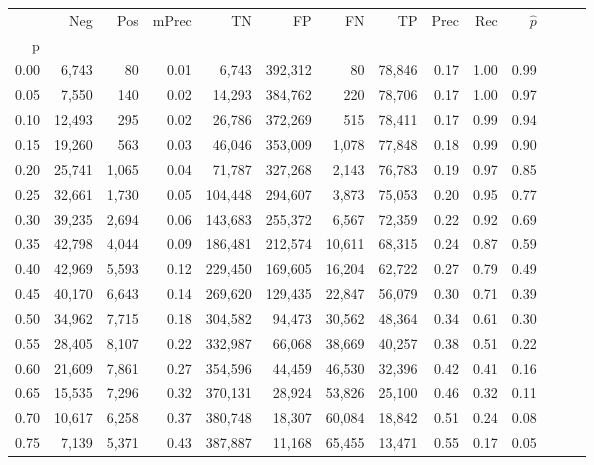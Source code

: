 \begin{tabular}{rrrrrrrrrrrrrr}
\toprule
{} &     Neg &    Pos & mPrec &       TN &       FP &      FN &      TP &  Prec &   Rec & $\hat{p}$ \\
p    &         &        &       &          &          &         &         &       &       &           \\
\midrule
0.00 &   6,743 &     80 &  0.01 &    6,743 &  392,312 &      80 &  78,846 &  0.17 &  1.00 &      0.99 \\
0.05 &   7,550 &    140 &  0.02 &   14,293 &  384,762 &     220 &  78,706 &  0.17 &  1.00 &      0.97 \\
0.10 &  12,493 &    295 &  0.02 &   26,786 &  372,269 &     515 &  78,411 &  0.17 &  0.99 &      0.94 \\
0.15 &  19,260 &    563 &  0.03 &   46,046 &  353,009 &   1,078 &  77,848 &  0.18 &  0.99 &      0.90 \\
0.20 &  25,741 &  1,065 &  0.04 &   71,787 &  327,268 &   2,143 &  76,783 &  0.19 &  0.97 &      0.85 \\
0.25 &  32,661 &  1,730 &  0.05 &  104,448 &  294,607 &   3,873 &  75,053 &  0.20 &  0.95 &      0.77 \\
0.30 &  39,235 &  2,694 &  0.06 &  143,683 &  255,372 &   6,567 &  72,359 &  0.22 &  0.92 &      0.69 \\
0.35 &  42,798 &  4,044 &  0.09 &  186,481 &  212,574 &  10,611 &  68,315 &  0.24 &  0.87 &      0.59 \\
0.40 &  42,969 &  5,593 &  0.12 &  229,450 &  169,605 &  16,204 &  62,722 &  0.27 &  0.79 &      0.49 \\
0.45 &  40,170 &  6,643 &  0.14 &  269,620 &  129,435 &  22,847 &  56,079 &  0.30 &  0.71 &      0.39 \\
0.50 &  34,962 &  7,715 &  0.18 &  304,582 &   94,473 &  30,562 &  48,364 &  0.34 &  0.61 &      0.30 \\
0.55 &  28,405 &  8,107 &  0.22 &  332,987 &   66,068 &  38,669 &  40,257 &  0.38 &  0.51 &      0.22 \\
0.60 &  21,609 &  7,861 &  0.27 &  354,596 &   44,459 &  46,530 &  32,396 &  0.42 &  0.41 &      0.16 \\
0.65 &  15,535 &  7,296 &  0.32 &  370,131 &   28,924 &  53,826 &  25,100 &  0.46 &  0.32 &      0.11 \\
0.70 &  10,617 &  6,258 &  0.37 &  380,748 &   18,307 &  60,084 &  18,842 &  0.51 &  0.24 &      0.08 \\
0.75 &   7,139 &  5,371 &  0.43 &  387,887 &   11,168 &  65,455 &  13,471 &  0.55 &  0.17 &      0.05 \\

\end{tabular}
